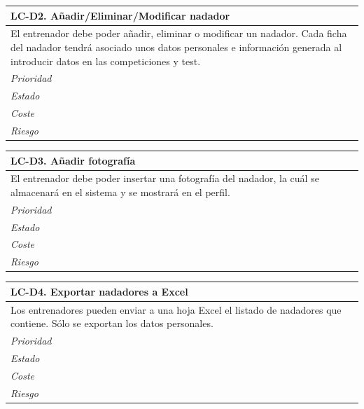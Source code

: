	\begin{center}
		\begin{tabularx}{15cm}{|X|}
			\hline 
				\bf{LC-D2. Añadir/Eliminar/Modificar nadador}\\
			\hline
				El entrenador debe poder añadir, eliminar o modificar un nadador. Cada ficha del nadador tendrá asociado unos datos personales e información generada al introducir datos en las competiciones y test.\\
			\hline
				\it{Prioridad}\\
			\hline
				\it{Estado}\\
			\hline
				\it{Coste}\\
			\hline
				\it{Riesgo}\\
			\hline
		\end{tabularx}
	\end{center}
	
	\begin{center}
		\begin{tabularx}{15cm}{|X|}
			\hline 
				\bf{LC-D3. Añadir fotografía}\\
			\hline
				El entrenador debe poder insertar una fotografía del nadador, la cuál se almacenará en el sistema y se mostrará en el perfil.\\
			\hline
				\it{Prioridad}\\
			\hline
				\it{Estado}\\
			\hline
				\it{Coste}\\
			\hline
				\it{Riesgo}\\
			\hline
		\end{tabularx}
	\end{center}
	
	\begin{center}
		\begin{tabularx}{15cm}{|X|}
			\hline 
				\bf{LC-D4. Exportar nadadores a Excel}\\
			\hline
				Los entrenadores pueden enviar a una hoja Excel el listado de nadadores que contiene. Sólo se exportan los datos personales.\\
			\hline
				\it{Prioridad}\\
			\hline
				\it{Estado}\\
			\hline
				\it{Coste}\\
			\hline
				\it{Riesgo}\\
			\hline
		\end{tabularx}
	\end{center}
	
